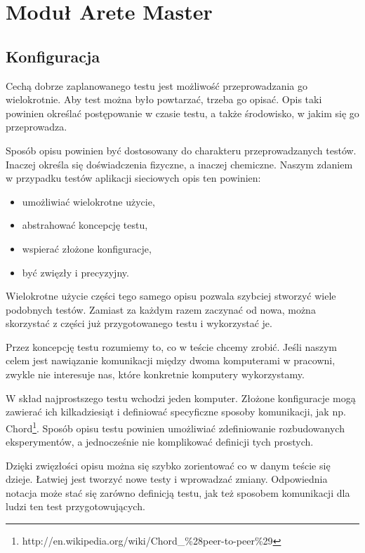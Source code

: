 \documentclass[00-praca-magisterska.tex]{subfiles}
\begin{document}
\chapter{Moduł Arete Master}

\section{Konfiguracja}

Cechą dobrze zaplanowanego testu jest możliwość przeprowadzania go
wielokrotnie. Aby test można było powtarzać, trzeba go opisać. Opis taki
powinien określać postępowanie w czasie testu, a także środowisko, w jakim się
go przeprowadza.

Sposób opisu powinien być dostosowany do charakteru przeprowadzanych testów.
Inaczej określa się doświadczenia fizyczne, a inaczej chemiczne. Naszym
zdaniem w przypadku testów aplikacji sieciowych opis ten powinien:
\begin{itemize}
\item umożliwiać wielokrotne użycie,
\item abstrahować koncepcję testu,
\item wspierać złożone konfiguracje,
\item być zwięzły i precyzyjny.
\end{itemize}

Wielokrotne użycie części tego samego opisu pozwala szybciej stworzyć wiele
podobnych testów. Zamiast za każdym razem zaczynać od nowa, można skorzystać z
części już przygotowanego testu i wykorzystać je.

Przez koncepcję testu rozumiemy to, co w teście chcemy zrobić. Jeśli naszym
celem jest nawiązanie komunikacji między dwoma komputerami w pracowni, zwykle
nie interesuje nas, które konkretnie komputery wykorzystamy.

W skład najprostszego testu wchodzi jeden komputer. Złożone konfiguracje mogą
zawierać ich kilkadziesiąt i definiować specyficzne sposoby komunikacji, jak
np. Chord\footnote{http://en.wikipedia.org/wiki/Chord\_\%28peer-to-peer\%29}.
Sposób opisu testu powinien umożliwiać zdefiniowanie rozbudowanych
eksperymentów, a jednocześnie nie komplikować definicji tych prostych.

Dzięki zwięzłości opisu można się szybko zorientować co w danym teście się
dzieje. Łatwiej jest tworzyć nowe testy i wprowadzać zmiany. Odpowiednia
notacja może stać się zarówno definicją testu, jak też sposobem komunikacji
dla ludzi ten test przygotowujących.
\end{document}
